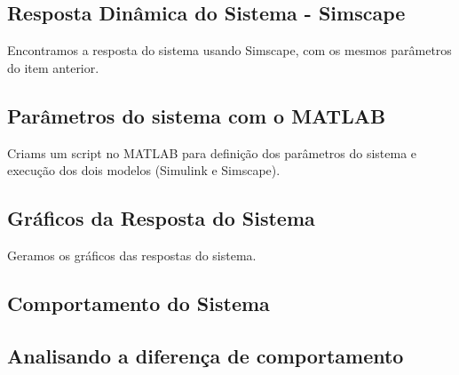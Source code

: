 \documentclass[a4paper, 12pt]{article}
\begin{document}
\subsection{Resposta Dinâmica do Sistema - Simscape}
Encontramos a resposta do sistema usando Simscape, com os mesmos parâmetros do item anterior.

\subsection{Parâmetros do sistema com o MATLAB}
Criams um script no MATLAB para definição dos parâmetros do sistema e execução dos dois modelos (Simulink e Simscape).

\subsection{Gráficos da Resposta do Sistema}
Geramos os gráficos das respostas do sistema. 

\subsection{Comportamento do Sistema}


\subsection{Analisando a diferença de comportamento}


\newpage

\nocite{*}

    
\end{document}
